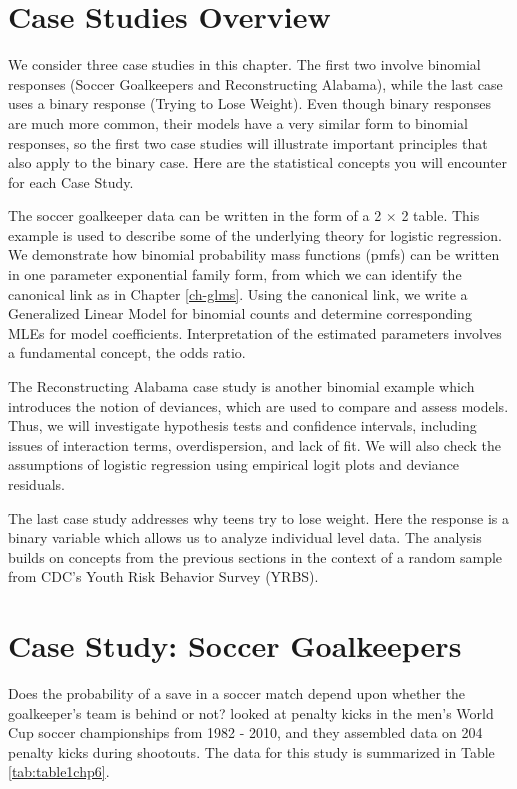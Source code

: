\documentclass[
]{krantz}
\begin{document}
\hypertarget{case-studies-overview-1}{%
\section{Case Studies Overview}\label{case-studies-overview-1}}

We consider three case studies in this chapter. The first two involve binomial responses (Soccer Goalkeepers and Reconstructing Alabama), while the last case uses a binary response (Trying to Lose Weight). Even though binary responses are much more common, their models have a very similar form to binomial responses, so the first two case studies will illustrate important principles that also apply to the binary case. Here are the statistical concepts you will encounter for each Case Study.

The soccer goalkeeper data can be written in the form of a 2 \(\times\) 2 table. This example is used to describe some of the underlying theory for logistic regression. We demonstrate how binomial probability mass functions (pmfs) can be written in one parameter exponential family form, from which we can identify the canonical link as in Chapter \ref{ch-glms}. Using the canonical link, we write a Generalized Linear Model for binomial counts and determine corresponding MLEs for model coefficients. Interpretation of the estimated parameters involves a fundamental concept, the odds ratio.

The Reconstructing Alabama case study is another binomial example which introduces the notion of deviances, which are used to compare and assess models. Thus, we will investigate hypothesis tests and confidence intervals, including issues of interaction terms, overdispersion, and lack of fit. We will also check the assumptions of logistic regression using empirical logit plots and deviance residuals.

The last case study addresses why teens try to lose weight. Here the response is a binary variable which allows us to analyze individual level data. The analysis builds on concepts from the previous sections in the context of a random sample from CDC's Youth Risk Behavior Survey (YRBS).

\hypertarget{case-study-soccer-goalkeepers}{%
\section{Case Study: Soccer Goalkeepers}\label{case-study-soccer-goalkeepers}}

Does the probability of a save in a soccer match depend upon whether the goalkeeper's team is behind or not? \citet{Roskes2011} looked at penalty kicks in the men's World Cup soccer championships from 1982 - 2010, and they assembled data on 204 penalty kicks during shootouts. The data for this study is summarized in Table \ref{tab:table1chp6}.
\end{document}
